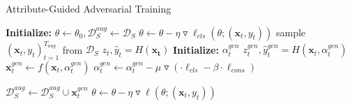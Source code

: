 \begin{algorithm}
    \caption{Attribute-Guided Adversarial Training}
    \label{alg:adv_algo}
    \small
    \begin{algorithmic}[1]
        \State \textbf{Initialize:} $\theta \gets \theta_0, \mathcal{D}^{aug}_S\gets\mathcal{D}_S$
                    \State $\theta \gets \theta - \eta\triangledown\ell_{cls}(\theta;(\mathbf{x}_t, y_t))$
                \EndForEach
            \Else
                        \State sample ${(\mathbf{x}_t, y_t)}_{t=1}^{T_{aug}}$ from $\mathcal{D}_S$
                        \State $z_t, \hat{y}_t = H(\mathbf{x_t})$
                        \State \textbf{Initialize:} $\alpha_t^{gen}$
                            \State $z^{gen}_t, \hat{y}^{gen}_t = H(\mathbf{x}_t, \alpha_t^{gen})$
                            \State $\mathbf{x}_t^{gen} \gets f(\mathbf{x}_t, \alpha_t^{gen})$
                            \State $\alpha_t^{gen} \gets \alpha_t^{gen} - \mu\triangledown (\cdot\ell_{cls}-\beta\cdot \ell_{cons})$
                        
                        \EndForEach
                        
                        \State $\mathcal{D}_S^{aug} \gets \mathcal{D}_S^{aug} \cup \mathbf{x}_t^{gen}$
                    \EndForEach
                \Else
                         \State $\theta \gets \theta - \eta\triangledown\ell(\theta;(\mathbf{x}_t, y_t))$
                    \EndForEach
                \EndIf
            \EndIf
        \EndForEach
    \end{algorithmic}
\end{algorithm}
%     
